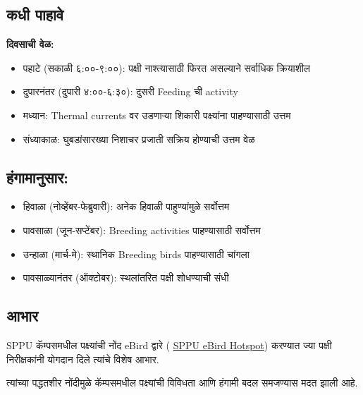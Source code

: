 \documentclass[a4paper,12pt,landscape]{memoir}
\newcommand{\introsection}[2]{%
  \begin{minipage}[t]{0.48\textwidth}
    \begin{mdframed}[
      linecolor=headingcolor,
      linewidth=1pt,
      roundcorner=5pt,
      leftmargin=0pt,
      rightmargin=0pt,
      backgroundcolor=headingcolor!5
    ]
      #1
    \end{mdframed}
  \end{minipage}\hfill
  \begin{minipage}[t]{0.48\textwidth}
    \begin{mdframed}[
      linecolor=headingcolor,
      linewidth=1pt,
      roundcorner=5pt,
      leftmargin=0pt,
      rightmargin=0pt,
      backgroundcolor=headingcolor!5
    ]
      #2
    \end{mdframed}
  \end{minipage}
  \newpage
}
\begin{document}
\introsection{%
  \section*{\textbf{कधी पाहावे}}
  \textbf{दिवसाची वेळ:}
  \begin{itemize}
  \item पहाटे (सकाळी ६:००-९:००): पक्षी नाश्त्यासाठी फिरत असल्याने सर्वाधिक क्रियाशील
  \item दुपारनंतर (दुपारी ४:००-६:३०): दुसरी {\latintext Feeding} ची {\latintext activity}
  \item मध्यान: {\latintext Thermal currents} वर उडणाऱ्या शिकारी पक्ष्यांना पाहण्यासाठी उत्तम
  \item संध्याकाळ: घुबडांसारख्या निशाचर प्रजाती सक्रिय होण्याची उत्तम वेळ
  \end{itemize}
}{%
  \section*{\textbf{हंगामानुसार:}}
  \begin{itemize}
  \item हिवाळा (नोव्हेंबर-फेब्रुवारी): अनेक हिवाळी पाहुण्यांमुळे सर्वोत्तम
  \item पावसाळा (जून-सप्टेंबर): {\latintext Breeding activities} पाहण्यासाठी सर्वोत्तम
  \item उन्हाळा (मार्च-मे): स्थानिक {\latintext Breeding birds} पाहण्यासाठी चांगला
  \item पावसाळ्यानंतर (ऑक्टोबर): स्थलांतरित पक्षी शोधण्याची संधी
  \end{itemize}
}

\introsection{%
  \section*{\textbf{आभार}}
  {\latintext SPPU} कॅम्पसमधील पक्ष्यांची नोंद {\latintext eBird} द्वारे ({\latintext
  \href{https://ebird.org/hotspot/L1838309}{SPPU eBird Hotspot}})
  करण्यात ज्या पक्षी निरीक्षकांनी योगदान दिले त्यांचे विशेष आभार.
}{%
  त्यांच्या पद्धतशीर नोंदीमुळे कॅम्पसमधील पक्ष्यांची विविधता आणि हंगामी बदल समजण्यास मदत झाली आहे.
}
\end{document}
